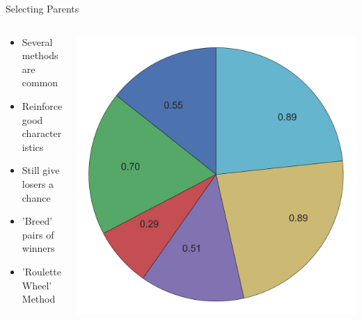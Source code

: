 \documentclass[10pt]{beamer}
\begin{document}
\begin{frame}{Selecting Parents}
	\begin{columns}[c] %
		\begin{column}{.48\textwidth}
			\begin{itemize}[<+->]
				\item {Several methods are common}
				\item {Reinforce good characteristics}
				\item {Still give losers a chance}
				\item {'Breed' pairs of winners}
				\item {'Roulette Wheel' Method}
			\end{itemize}				
		\end{column}
		\hfill
		\begin{column}{0.48\textwidth}
		    \begin{overprint}
				\includegraphics[width=\linewidth]{images/pie1.PNG}

\end{overprint}
\end{column}
\end{columns}
\end{frame}
\end{document}
